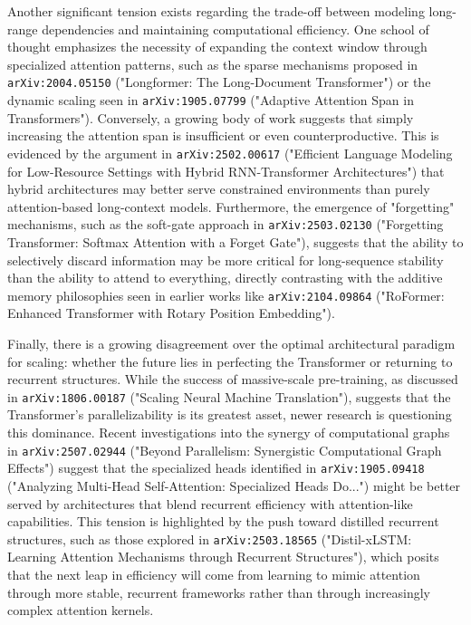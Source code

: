 \documentclass[11pt]{article}
\begin{document}
Another significant tension exists regarding the trade-off between modeling long-range dependencies and maintaining computational efficiency. One school of thought emphasizes the necessity of expanding the context window through specialized attention patterns, such as the sparse mechanisms proposed in \texttt{arXiv:2004.05150} ("Longformer: The Long-Document Transformer") or the dynamic scaling seen in \texttt{arXiv:1905.07799} ("Adaptive Attention Span in Transformers"). Conversely, a growing body of work suggests that simply increasing the attention span is insufficient or even counterproductive. This is evidenced by the argument in \texttt{arXiv:2502.00617} ("Efficient Language Modeling for Low-Resource Settings with Hybrid RNN-Transformer Architectures") that hybrid architectures may better serve constrained environments than purely attention-based long-context models. Furthermore, the emergence of "forgetting" mechanisms, such as the soft-gate approach in \texttt{arXiv:2503.02130} ("Forgetting Transformer: Softmax Attention with a Forget Gate"), suggests that the ability to selectively discard information may be more critical for long-sequence stability than the ability to attend to everything, directly contrasting with the additive memory philosophies seen in earlier works like \texttt{arXiv:2104.09864} ("RoFormer: Enhanced Transformer with Rotary Position Embedding").

Finally, there is a growing disagreement over the optimal architectural paradigm for scaling: whether the future lies in perfecting the Transformer or returning to recurrent structures. While the success of massive-scale pre-training, as discussed in \texttt{arXiv:1806.00187} ("Scaling Neural Machine Translation"), suggests that the Transformer's parallelizability is its greatest asset, newer research is questioning this dominance. Recent investigations into the synergy of computational graphs in \texttt{arXiv:2507.02944} ("Beyond Parallelism: Synergistic Computational Graph Effects") suggest that the specialized heads identified in \texttt{arXiv:1905.09418} ("Analyzing Multi-Head Self-Attention: Specialized Heads Do...") might be better served by architectures that blend recurrent efficiency with attention-like capabilities. This tension is highlighted by the push toward distilled recurrent structures, such as those explored in \texttt{arXiv:2503.18565} ("Distil-xLSTM: Learning Attention Mechanisms through Recurrent Structures"), which posits that the next leap in efficiency will come from learning to mimic attention through more stable, recurrent frameworks rather than through increasingly complex attention kernels.
\end{document}

